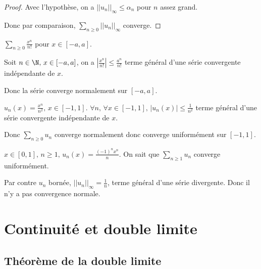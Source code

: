 \begin{proof}
    Avec l'hypothèse, on a $||u_n||_\infty \leqslant \alpha_n$ pour $n$ assez grand. 

    Donc par comparaison, $\displaystyle \sum_{n \geqslant 0} || u_n ||_{\infty}$ converge.
\end{proof}

\begin{exemple}
    $\displaystyle \sum_{n \geqslant 0 } \frac{x^n }{n!}$ pour $x \in [-a, a]$. 

    Soit $n \in \N, \, x \in [-a, a]$, on a $\left| \frac{x^n }{n !} \right| \leqslant \frac{a^n }{n!}$ 
    terme général d'une série convergente indépendante de $x$.

    Donc la série converge normalement sur $[-a, a]$.

    \lvspace $u_n(x) = \frac{x^n }{n^2}, \, x \in [-1, 1]$. $\forall n, \, \forall x \in [-1, 1], \, |u_n(x)| \leqslant \frac{1 }{n^2}$
    terme général d'une série convergente indépendante de $x$.

    Donc $\displaystyle \sum_{n \geqslant 0} u_n$ converge normalement donc converge uniformément sur $[-1, 1]$.

    \lvspace $\displaystyle x \in [0, 1], \, n \geqslant 1, \, u_n(x) = \frac{(-1)^n x^n} n$. On sait que 
    $\displaystyle \sum_{n \geqslant 1} u_n$ converge uniformément. 

    Par contre  $u_n$ bornée, $||u_n||_{\infty} = \frac 1 n$, terme général d'une série divergente. Donc il 
    n'y a pas convergence normale.
\end{exemple}


\section{Continuité et double limite}
\subsection{Théorème de la double limite} 

